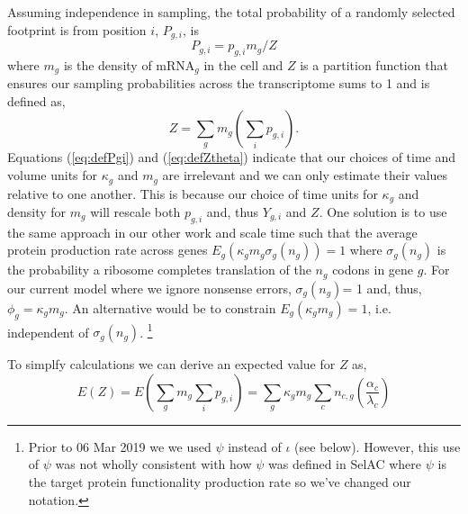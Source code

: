 \documentclass{article}
\newcommand{\sigmagng}{\ensuremath{\sigma_{g}(\ng)}\xspace}
\newcommand{\sigmang}{\sigmagng}
\newcommand{\pgi}{\ensuremath{{p_{g,i}}}\xspace}
\newcommand{\Pgi}{\ensuremath{{P_{g,i}}}\xspace}
\renewcommand{\ng}{\ensuremath{{n_{g}}}\xspace}
\newcommand{\mg}{\ensuremath{{m_g}}\xspace}
\newcommand{\phig}{\ensuremath{{\phi_g}}\xspace}
\newcommand{\kappag}{\ensuremath{{\kappa_{g}}}\xspace}
\newcommand{\Ztheta}{\ensuremath{{Z}}\xspace}
\newcommand{\mRNAg}{mRNA$_g$\xspace}
\newcommand{\Ygi}{\ensuremath{{Y_{g,i}}}\xspace}
\begin{document}
Assuming independence in sampling, the total probability of a randomly selected footprint is from position $i$, $\Pgi$, is
\begin{equation} 
\label{eq:defPgi}
\Pgi = \pgi \mg/\Ztheta 
\end{equation}
where \mg is the density of \mRNAg in the cell and \Ztheta is a partition function that ensures our sampling probabilities across the transcriptome sums to 1 and is defined as,
\begin{equation}
  \label{eq:defZtheta}
  \Ztheta = \sum_g \mg \left(\sum_i \pgi\right).
\end{equation}
Equations (\ref{eq:defPgi}) and (\ref{eq:defZtheta}) indicate that our choices of time and volume units for \kappag and \mg are irrelevant and we can only estimate their values relative to one another.
This is because our choice of time units for $\kappag$ and density for $m_g$ will rescale both \pgi and, thus $\Ygi$ and $Z$.
One solution is to use the same approach in our other work and  scale time such that the average protein production rate across genes $E_g\left(\kappag \mg \sigmang\right) = 1$ where \sigmang is the probability a ribosome completes translation of the \ng codons in gene $g$.
For our current model where we ignore nonsense errors, \sigmagng = 1 and, thus, $\phig = \kappag \mg$.
An alternative would be to constrain $E_g\left(\kappag \mg\right) = 1$, i.e. independent of \sigmang.
\footnote{Prior to 06 Mar 2019 we we used $\psi$ instead of $\iota$ (see below).
  However, this use of $\psi$ was not wholly consistent with how $\psi$ was defined in SelAC where $\psi$ is the  target protein functionality production rate so we've changed our notation.
  }
  
To simplfy calculations we can derive an expected value for $\Ztheta$ as,
\begin{equation}
 \label{eq:defExpZtheta}
 E(\Ztheta) = E(\sum_g m_g \sum_i p_{g,i}) = \sum_g \kappag \mg  \sum_c n_{c,g} (\frac{\alpha_c}{\lambda_c})
\end{equation}

\end{document}
